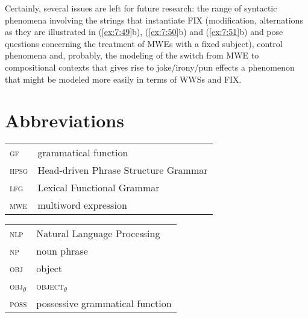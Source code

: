 \documentclass[output=paper]{langsci/langscibook}
\begin{document}
Certainly, several issues are left for future research:  the range of syntactic phenomena involving the strings that instantiate FIX (modification, alternations as they are illustrated in (\ref{ex:7:49}b), (\ref{ex:7:50}b) and (\ref{ex:7:51}b) and pose questions concerning the treatment of  MWEs with a fixed subject), control phenomena and, probably,  the modeling of the switch from  MWE to compositional contexts that gives rise to joke/irony/pun effects \textendash a phenomenon that might be modeled more easily in terms of WWSs and FIX. 

\section*{Abbreviations}
 
\begin{tabularx}{.48\textwidth}{lQ}
\textsc{gf} & grammatical function \\
\textsc{hpsg} & Head-driven Phrase Structure Grammar \\
\textsc{lfg} & Lexical Functional Grammar  \\
\textsc{mwe} & multiword expression \\
\end{tabularx}
\begin{tabularx}{.51\textwidth}{lQ}
\textsc{nlp} & Natural Language Processing \\
\textsc{np} & noun phrase \\
\textsc{obj} & object \\
\textsc{obj}$_\theta$& \textsc{object}$_\theta$ \\
\textsc{poss} & possessive grammatical function \\
\end{tabularx} 

\sloppy
\printbibliography[heading=subbibliography,notkeyword=this]
\end{document}
